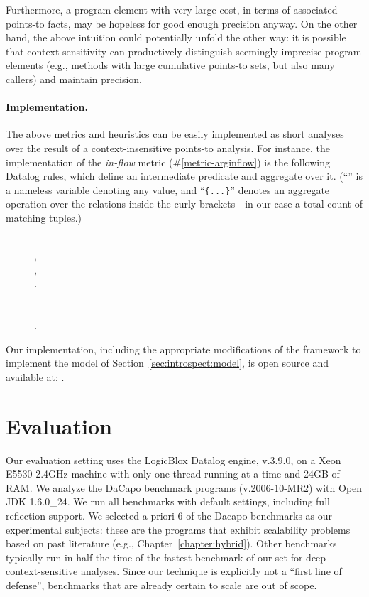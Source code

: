 Furthermore, a program element with very large cost, in terms of associated points-to facts, may be hopeless for good enough precision anyway. On the other hand, the above intuition could potentially unfold the other way: it is possible that context-sensitivity can productively distinguish seemingly-imprecise program elements (e.g., methods with large cumulative points-to sets, but also many callers) and maintain precision.

\paragraph*{Implementation.}
The above metrics and heuristics can be easily implemented as short analyses over the result of a context-insensitive points-to analysis. For instance, the implementation of the \emph{in-flow} metric (\#\ref{metric-arginflow}) is the following Datalog rules, which define an intermediate predicate and aggregate over it. (``\args{\_}'' is a nameless variable denoting any value, and ``\texttt{\{...\}}'' denotes an aggregate operation over the relations inside the curly brackets---in our case a total count of matching tuples.)

\begin{figure}[h]
\begin{datalog}
 \dlIf{} \\
    ,\\
    ,\\
    .\\
\\
 \dlIf{} \\
    .
\end{datalog}
\end{figure}

\vspace{-2mm}
\noindent Our implementation, including the appropriate modifications of the \doop{} framework to implement the model of Section~\ref{sec:introspect:model}, is open source and available at: \todo{}.


\section{Evaluation}

Our evaluation setting uses the \todo{} LogicBlox Datalog engine, v.3.9.0, on a Xeon E5530 2.4GHz machine with only one thread running at a time and 24GB of RAM. We analyze the DaCapo benchmark programs (v.2006-10-MR2) with Open JDK 1.6.0\_24. We run all benchmarks with default \doop{} settings, including full reflection support. We selected a priori 6 of the Dacapo benchmarks as our experimental subjects: these are the programs that exhibit scalability problems based on past literature (e.g., Chapter~\ref{chapter:hybrid}). Other benchmarks typically run in half the time of the fastest benchmark of our set for deep context-sensitive analyses. Since our technique is explicitly not a ``first line of defense'', benchmarks that are already certain to scale are out of scope.

